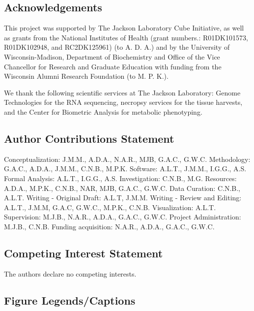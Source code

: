 \documentclass[
]{article}
\begin{document}
\subsection{Acknowledgements}\label{acknowledgements}

This project was supported by The Jackson Laboratory Cube Initiative, as
well as grants from the National Institutes of Health (grant numbers.:
R01DK101573, R01DK102948, and RC2DK125961) (to A. D. A.) and by the
University of Wisconsin-Madison, Department of Biochemistry and Office
of the Vice Chancellor for Research and Graduate Education with funding
from the Wisconsin Alumni Research Foundation (to M. P. K.).

We thank the following scientific services at The Jackson Laboratory:
Genome Technologies for the RNA sequencing, necropsy services for the
tissue harvests, and the Center for Biometric Analysis for metabolic
phenotyping.

\subsection{Author Contributions
Statement}\label{author-contributions-statement}

Conceptualization: J.M.M., A.D.A., N.A.R., MJB, G.A.C., G.W.C.
Methodology: G.A.C., A.D.A., J.M.M., C.N.B., M.P.K. Software: A.L.T.,
J.M.M., I.G.G., A.S. Formal Analysis: A.L.T., I.G.G., A.S.
Investigation: C.N.B., M.G. Resources: A.D.A., M.P.K., C.N.B., NAR, MJB,
G.A.C., G.W.C. Data Curation: C.N.B., A.L.T. Writing - Original Draft:
A.L.T, J.M.M. Writing - Review and Editing: A.L.T., J.M.M, G.A.C,
G.W.C., M.P.K., C.N.B. Visualization: A.L.T. Supervision: M.J.B.,
N.A.R., A.D.A., G.A.C., G.W.C. Project Administration: M.J.B., C.N.B.
Funding acquisition: N.A.R., A.D.A., G.A.C., G.W.C.

\subsection{Competing Interest
Statement}\label{competing-interest-statement}

The authors declare no competing interests.

\subsection{Figure Legends/Captions}\label{figure-legendscaptions}
\end{document}
